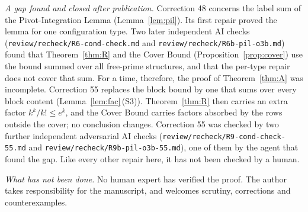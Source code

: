 \emph{A gap found and closed after publication.} Correction 48 concerns the label sum of the Pivot-Integration Lemma
(Lemma~\ref{lem:pil}). Its first repair proved the lemma for one configuration type. Two later independent AI checks
(\texttt{review/recheck/R6-cond-check.md} and \texttt{review/recheck/R6b-pil-o3b.md}) found that Theorem~\ref{thm:R} and
the Cover Bound (Proposition~\ref{prop:cover}) use the bound summed over all free-prime structures, and that the per-type
repair does not cover that sum. For a time, therefore, the proof of Theorem~\ref{thm:A} was incomplete. Correction 55
replaces the block bound by one that sums over every block content (Lemma~\ref{lem:fac}\,(S3)). Theorem~\ref{thm:R} then
carries an extra factor $k^k/k!\le e^k$, and the Cover Bound carries factors absorbed by the rows outside the cover; no
conclusion changes. Correction 55 was checked by two further independent adversarial AI checks
(\texttt{review/recheck/R9-cond-check-55.md} and \texttt{review/recheck/R9b-pil-o3b-55.md}), one of them by the agent
that found the gap. Like every other repair here, it has not been checked by a human.

\emph{What has not been done.} No human expert has verified the proof. The author takes responsibility for the manuscript, and
welcomes scrutiny, corrections and counterexamples.

